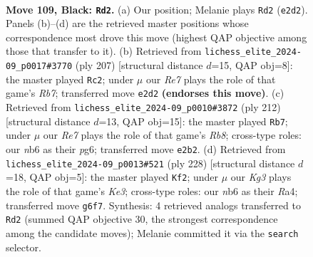 \documentclass[11pt]{article}
\begin{document}
\begin{figure}[p]\centering
\begin{subfigure}{0.46\textwidth}\centering
\resizebox{\linewidth}{!}{%
\newchessgame
\chessboard[
  setfen={8/6p1/1N3pk1/R6p/7P/6PK/4r3/8 b - - 43 109},
  showmover=false,
  pgfstyle=straightmove, color=movearrow, markmove={e2-d2}
]}
\caption{}
\end{subfigure}\hfill
\begin{subfigure}{0.46\textwidth}\centering
\resizebox{\linewidth}{!}{%
\newchessgame
\chessboard[
  setfen={8/5R2/6pk/7p/7P/6PK/1r6/8 b - - 45 104},
  showmover=false,
  pgfstyle=straightmove, color=movearrow, markmove={b2-c2}
]}
\caption{}
\end{subfigure}
\\[4pt]
\begin{subfigure}{0.46\textwidth}\centering
\resizebox{\linewidth}{!}{%
\newchessgame
\chessboard[
  setfen={1R6/5pk1/6p1/4P2p/5K1P/5PP1/8/4r3 w - - 5 107},
  showmover=false,
  pgfstyle=straightmove, color=movearrow, markmove={b8-b7}
]}
\caption{}
\end{subfigure}\hfill
\begin{subfigure}{0.46\textwidth}\centering
\resizebox{\linewidth}{!}{%
\newchessgame
\chessboard[
  setfen={8/4r3/6pk/7p/R6P/4KPP1/8/8 w - - 39 115},
  showmover=false,
  pgfstyle=straightmove, color=movearrow, markmove={e3-f2}
]}
\caption{}
\end{subfigure}
\caption{\textbf{Move 109, Black: \texttt{Rd2}.} (a) Our position; Melanie plays \texttt{Rd2} (\texttt{e2d2}). Panels (b)--(d) are the retrieved master positions whose correspondence most drove this move (highest QAP objective among those that transfer to it). (b) Retrieved from \texttt{lichess\_elite\_2024-09\_p0017\#3770} (ply 207) [structural distance $d$=15, QAP obj=8]: the master played \texttt{Rc2}; under $\mu$ our \emph{Re7} plays the role of that game's \emph{Rb7}; transferred move \texttt{e2d2} \textbf{(endorses this move)}. (c) Retrieved from \texttt{lichess\_elite\_2024-09\_p0010\#3872} (ply 212) [structural distance $d$=13, QAP obj=15]: the master played \texttt{Rb7}; under $\mu$ our \emph{Re7} plays the role of that game's \emph{Rb8}; cross-type roles: our \emph{n}b6 as their \emph{p}g6; transferred move \texttt{e2b2}. (d) Retrieved from \texttt{lichess\_elite\_2024-09\_p0013\#521} (ply 228) [structural distance $d$=18, QAP obj=5]: the master played \texttt{Kf2}; under $\mu$ our \emph{Kg3} plays the role of that game's \emph{Ke3}; cross-type roles: our \emph{n}b6 as their \emph{R}a4; transferred move \texttt{g6f7}. Synthesis: 4 retrieved analogs transferred to \texttt{Rd2} (summed QAP objective 30, the strongest correspondence among the candidate moves); Melanie committed it via the \texttt{search} selector.}
\label{fig:thought-m217}
\end{figure}
\end{document}
